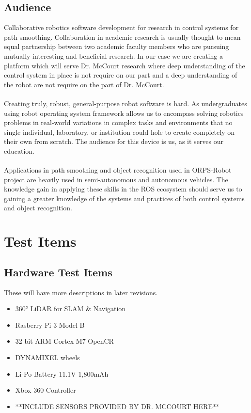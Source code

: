 \documentclass[english,12pt]{article}
\begin{document}
\subsection{Audience}
Collaborative robotics software development for research in control systems 
for path smoothing. Collaboration in academic research is usually thought to mean 
equal partnership between two academic faculty members who are pursuing mutually 
interesting and beneficial research. In our case we are creating a platform which 
will serve Dr. McCourt research where deep understanding of the control system in 
place is not require on our part and a deep understanding of the robot are not 
require on the part of Dr. McCourt.\\\\
Creating truly, robust, general-purpose robot software is hard. As 
undergraduates using robot operating system framework allows us to encompass 
solving robotics problems in real-world variations in complex tasks and 
environments that no single individual, laboratory, or institution could 
hole to create completely on their own from scratch. The audience for this 
device is us, as it serves our education.\\\\
Applications in path smoothing and object recognition used in 
ORPS-Robot project are heavily used in semi-autonomous and autonomous 
vehicles. The knowledge gain in applying these skills in the ROS ecosystem 
should serve us to gaining a greater knowledge of the systems and 
practices of both control systems and object recognition.
\section{Test Items}
\subsection{Hardware Test Items}
These will have more descriptions in later revisions.
\begin{itemize}
    \item[] \ang{360} LiDAR for SLAM \& Navigation
    \item[] Rasberry Pi 3 Model B
    \item[] 32-bit ARM Cortex-M7 OpenCR
    \item[] DYNAMIXEL wheels
    \item[] Li-Po Battery 11.1V 1,800mAh 
    \item[] Xbox 360 Controller 
    \item[] **INCLUDE SENSORS PROVIDED BY DR. MCCOURT HERE** 
\end{itemize}
\end{document}
